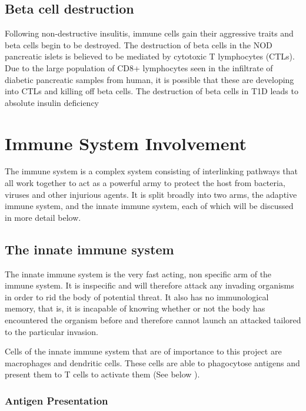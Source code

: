 \subsection{Beta cell destruction}

Following non-destructive insulitis, immune cells gain their aggressive traits and beta cells begin to be destroyed.
The destruction of beta cells in the NOD pancreatic islets is believed to be mediated by cytotoxic T lymphocytes (CTLs)\citep{Thomas2000, Brodie2008}.
Due to the large population of CD8+ lymphocytes seen in the infiltrate of diabetic pancreatic samples from human\citep{Hanafusa2008}, it is possible that these are developing into CTLs and killing off beta cells.
The destruction of beta cells in T1D leads to absolute insulin deficiency \citep{Daneman2006}



\section{Immune System Involvement}

The immune system is a complex system consisting of interlinking pathways that all work together to act as a powerful army to protect the host from bacteria, viruses and other injurious agents.
It is split broadly into two arms, the adaptive immune system, and the innate immune system, each of which will be discussed in more detail below.


\subsection{The innate immune system}
The innate immune system is the very fast acting, non specific arm of the immune system.
It is inspecific and will therefore attack any invading organisms in order to rid the body of potential threat.
It also has no immunological memory, that is, it is incapable of knowing whether or not the body has encountered the organism before and therefore cannot launch an attacked tailored to the particular invasion.

Cells of the innate immune system that are of importance to this project are macrophages and dendritic cells.
These cells are able to phagocytose antigens and present them to T cells to activate them (See below ).

\subsubsection{Antigen Presentation}

